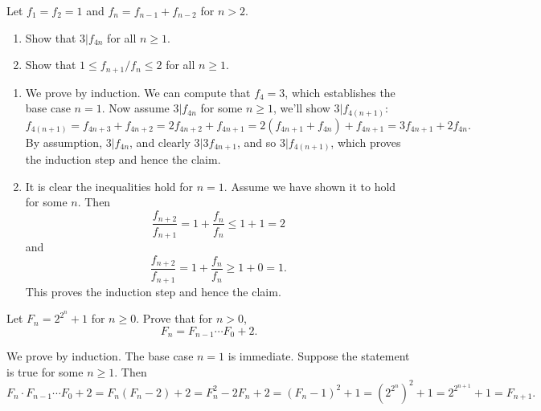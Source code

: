 \documentclass[11pt,dvipsnames]{book}
\numberwithin{figure}{section} %
\numberwithin{table}{section} %
\begin{document}
\begin{exercise}  Let $f_{1}=f_{2}=1$ and $f_{n}=f_{n-1}+f_{n-2}$ for $n>2$.
\begin{enumerate}[label=(\alph*)]
\item Show that $3|f_{4n}$ for all $n\geq 1$.
\item Show that $1\leq f_{n+1}/f_{n}\leq 2$ for all $n\geq 1$.
\end{enumerate}

\begin{solution}
\begin{enumerate}[label=(\alph*)]
\item We prove by induction. We can compute that $f_{4}=3$, which establishes the base case $n=1$. Now assume $3|f_{4n}$ for some $n\geq 1$, we'll show $3|f_{4(n+1)}$:
\[
f_{4(n+1)}=f_{4n+3}+f_{4n+2}
=2f_{4n+2}+f_{4n+1}
=2(f_{4n+1}+f_{4n})+f_{4n+1}
=3f_{4n+1}+2f_{4n}.
\]
By assumption, $3|f_{4n}$, and clearly $3|3f_{4n+1}$, and so $3|f_{4(n+1)}$, which proves the induction step and hence the claim.
\item It is clear the inequalities hold for $n=1$. Assume we have shown it to hold for some $n$. Then
\[
\frac{f_{n+2}}{f_{n+1}}=1+\frac{f_{n}}{f_{n}}\leq 1+1=2
\]
and
\[
\frac{f_{n+2}}{f_{n+1}}=1+\frac{f_{n}}{f_{n}}\geq 1+0=1.\]
This proves the induction step and hence the claim.
\end{enumerate}
\end{solution}
\end{exercise}

\begin{exercise}
Let $F_{n}=2^{2^{n}}+1$ for $n\geq 0$. Prove that for $n>0$,
\[
F_{n} = F_{n-1}\cdots F_{0}+2.
\]
\begin{solution}
We prove by induction. The base case $n=1$ is immediate. Suppose the statement is true for some $n\geq 1$. Then
\[
F_{n}\cdot F_{n-1}\cdots F_{0}+2
= F_{n}(F_{n}-2)+2
=F_{n}^{2}-2F_{n}+2
=(F_{n}-1)^2+1
=(2^{2^{n}})^2+1 = 2^{2^{n+1}}+1 =F_{n+1}.
\]
\end{solution}
\end{exercise}
\end{document}

